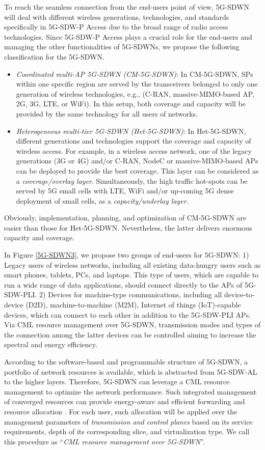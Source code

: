 \documentclass[conference]{IEEEtran}
\begin{document}
To reach the seamless connection from the end-users point of view, 5G-SDWN will deal with different wireless generations, technologies, and standards specifically in 5G-SDW-P Access due to the broad range of radio access technologies. Since 5G-SDW-P Access plays a crucial role for the end-users and managing the other functionalities of 5G-SDWNs, we propose the following classification for the 5G-SDWN.
\begin{itemize}
\item  \textit{Coordinated multi-AP 5G-SDWN (CM-5G-SDWN)}: In CM-5G-SDWN, SPs within one specific region are served by the transceivers belonged to only one generation of wireless technologies, e.g., (C-RAN, massive-MIMO-based AP, 2G, 3G, LTE, or WiFi). In this setup, both coverage and capacity will be provided by the same technology for all users of networks.
\item \textit{Heterogeneous multi-tier 5G-SDWN (Het-5G-SDWN)}: In Het-5G-SDWN, different generations and technologies support the coverage and capacity of wireless access. For example, in a wireless access network, one of the legacy generations (3G or 4G) and/or C-RAN, NodeC or massive-MIMO-based APs can be deployed to provide the best coverage. This layer can be considered as a \textit{coverage/overlay layer}. Simultaneously, the high traffic hot-spots can be served by 5G small cells with LTE, WiFi and/or up-coming 5G dense deployment of small cells, as a \textit{capacity/underlay layer}.
\end{itemize}
Obviously, implementation, planning, and optimization of CM-5G-SDWN are easier than those for Het-5G-SDWN. Nevertheless, the latter delivers enormous capacity and coverage. 

In Figure \ref{5G-SDWN3}, we propose two groups of end-users for 5G-SDWN: 1) Legacy users of wireless networks, including all existing data-hungry users such as smart phones, tablets, PCs, and laptops. This type of users, which are capable to run a wide range of data applications, should connect directly to the APs of 5G-SDW-PLI. 2)  Devices for machine-type communications, including all device-to-device (D2D), machine-to-machine (M2M), Internet of things (IoT)-capable devices, which can connect to each other in addition to the 5G-SDW-PLI APs. Via CML resource management over 5G-SDWN, transmission modes and types of the connection among the latter devices can be controlled aiming to increase the spectral and energy efficiency.


According to the software-based and programmable structure of 5G-SDWN, a portfolio of network resources is available, which is abstracted from 5G-SDW-AL to the higher layers. Therefore, 5G-SDWN can leverage a CML resource management to optimize the network performance. Such integrated management of converged resources can provide energy-aware and efficient forwarding and resource allocation \cite{lin2014enabling}. For each user, such allocation will be applied over the management parameters of \textit{transmission and control planes} based on its service requirements, depth of its corresponding slice, and virtualization type. We call this procedure as ``\textit{CML resource management over 5G-SDWN}''.
	
\end{document}
